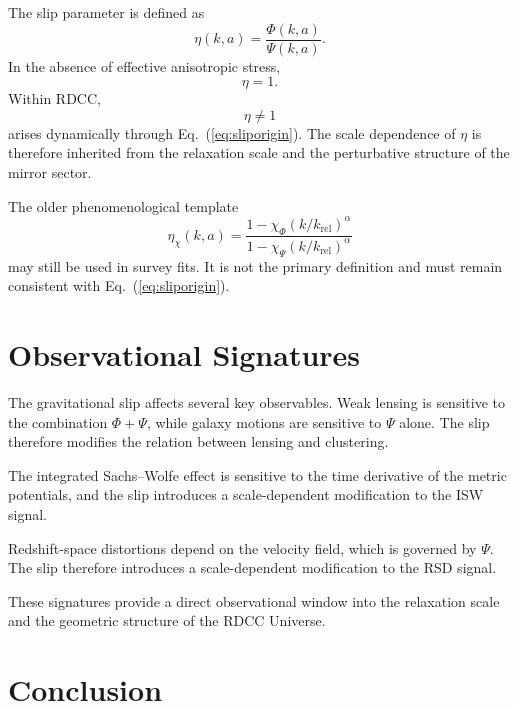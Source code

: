 \documentclass[11pt,a4paper]{article}
\begin{document}
The slip parameter is defined as
\begin{equation}
  \eta(k,a)
  =
  \frac{\Phi(k,a)}{\Psi(k,a)}.
\end{equation}
In the absence of effective anisotropic stress,
\begin{equation}
  \eta = 1.
\end{equation}
Within RDCC,
\begin{equation}
  \eta \neq 1
\end{equation}
arises dynamically through Eq.~(\ref{eq:sliporigin}). The scale dependence of
\(\eta\) is therefore inherited from the relaxation scale and the perturbative
structure of the mirror sector.

The older phenomenological template
\begin{equation}
  \eta_{\chi}(k,a)
  =
  \frac{
    1 - \chi_{\Phi}
    \left(k/k_{\mathrm{rel}}\right)^{\alpha}
  }{
    1 - \chi_{\Psi}
    \left(k/k_{\mathrm{rel}}\right)^{\alpha}
  }
\end{equation}
may still be used in survey fits. It is not the primary definition and must
remain consistent with Eq.~(\ref{eq:sliporigin}).

\section{Observational Signatures}

The gravitational slip affects several key observables. Weak lensing is
sensitive to the combination \(\Phi+\Psi\), while galaxy motions are sensitive
to \(\Psi\) alone. The slip therefore modifies the relation between lensing and
clustering.

The integrated Sachs--Wolfe effect is sensitive to the time derivative of the
metric potentials, and the slip introduces a scale-dependent modification to
the ISW signal.

Redshift-space distortions depend on the velocity field, which is governed by
\(\Psi\). The slip therefore introduces a scale-dependent modification to the
RSD signal.

These signatures provide a direct observational window into the relaxation
scale and the geometric structure of the RDCC Universe.

\section{Conclusion}
\end{document}
